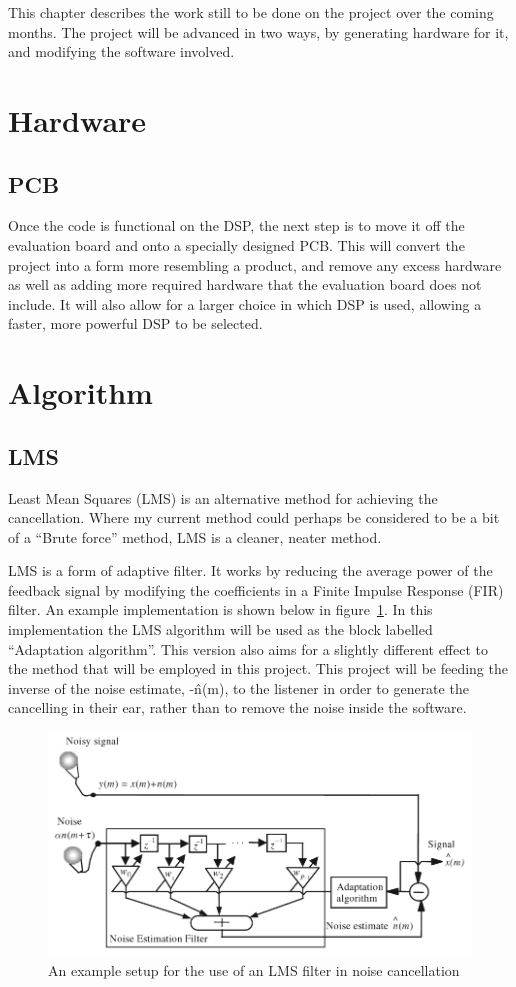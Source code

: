 This chapter describes the work still to be done on the project over the coming months.
The project will be advanced in two ways, by generating hardware for it, and modifying the software involved.

\section{Hardware}
\subsection{PCB}
Once the code is functional on the DSP, the next step is to move it off the evaluation board and onto a specially designed PCB.
This will convert the project into a form more resembling a product, and remove any excess hardware as well as adding more required hardware that the evaluation board does not include.
It will also allow for a larger choice in which DSP is used, allowing a faster, more powerful DSP to be selected.

\section{Algorithm}
\subsection{LMS}
\label{sec:LMS}
Least Mean Squares (LMS) is an alternative method for achieving the cancellation.
Where my current method could perhaps be considered to be a bit of a ``Brute force'' method, LMS is a cleaner, neater method.

LMS is a form of adaptive filter.
It works by reducing the average power of the feedback signal by modifying the coefficients in a Finite Impulse Response (FIR) filter.
An example implementation is shown below in figure~\ref{fig:lmsfilter}.
In this implementation the LMS algorithm will be used as the block labelled ``Adaptation algorithm''.
This version also aims for a slightly different effect to the method that will be employed in this project.
This project will be feeding the inverse of the noise estimate, -\^{n}(m), to the listener in order to generate the cancelling in their ear, rather than to remove the noise inside the software.

\begin{figure}[H]
	\centering
	\includegraphics[width=\textwidth]{./img/lmsfilter.png}
	\caption{An example setup for the use of an LMS filter in noise cancellation \cite{AdvancedDSPing}}
	\label{fig:lmsfilter}
\end{figure}

